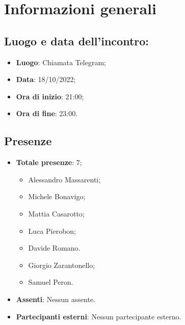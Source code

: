 \section{Informazioni generali}
    \subsection{Luogo e data dell'incontro:}
    \begin{itemize}
        \item \textbf{Luogo}: Chiamata Telegram;
        \item \textbf{Data}: 18/10/2022;
        \item \textbf{Ora di inizio}: 21:00;
        \item \textbf{Ora di fine}: 23:00.
    \end{itemize}
    \subsection{Presenze}
    \begin{itemize}
        \item \textbf{Totale presenze}: 7;
        \begin{itemize}
            \item Alessandro Massarenti;
            \item Michele Bonavigo;
            \item Mattia Casarotto;
            \item Luca Pierobon;
            \item Davide Romano.
            \item Giorgio Zarantonello;
            \item Samuel Peron.
        \end{itemize}
        \item \textbf{Assenti}: Nessun assente.
        \item \textbf{Partecipanti esterni}: Nessun partecipante esterno.
    \end{itemize}
